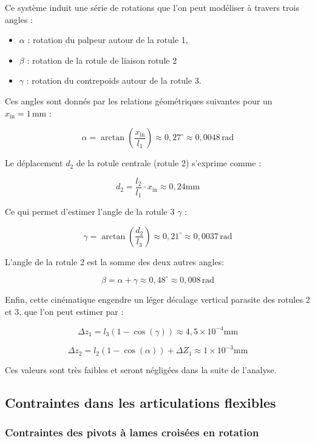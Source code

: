 \documentclass[a4paper, 11pt]{article} %
\begin{document}
Ce système induit une série de rotations que l’on peut modéliser à travers trois angles :
\begin{itemize}
    \item  \( \alpha \) : rotation du palpeur autour de la rotule 1,
    \item  \( \beta \) : rotation de la rotule de liaison rotule 2
    \item  \( \gamma \) : rotation du contrepoids autour de la rotule 3.
\end{itemize}




Ces angles sont donnés par les relations géométriques suivantes pour un $x_{\text{in} } = 1 \, \text{mm}$   :

\[
\alpha = \arctan\left( \frac{x_{\text{in}}}{l_1} \right) \approx 0,27^\circ \approx 0{,}0048 \, \text{rad}
\]

Le déplacement \( d_2 \) de la rotule centrale (rotule 2) s’exprime comme :

\[
d_2 = \frac{l_2}{l_1} \cdot x_{\text{in}} \approx 0,24
 \text{mm}
\]

Ce qui permet d'estimer l'angle de la rotule 3 \( \gamma \) :

$$
\gamma = \arctan\left( \frac{d_2}{l_3} \right) \approx 0,21^\circ \approx 0,0037\, \text{rad}
$$

L’angle de la rotule 2 est la somme des deux autres angles:

\[
\beta = \alpha + \gamma \approx 0,48^\circ
 \approx 0,008
 \, \text{rad}
\]

Enfin, cette cinématique engendre un léger décalage vertical parasite des rotules 2 et 3, que l’on peut estimer par :

$$
\Delta z_1 = l_3 (1 - \cos(\gamma)) \approx 4,5
\times 10^{-4}\text{mm}
$$

$$
\Delta z_2 = l_2 (1 - \cos(\alpha)) + \Delta Z_1 \approx 1\times 10^{-3}\text{mm}
$$



Ces valeurs sont très faibles et seront négligées dans la suite de l'analyse.

\subsection{Contraintes dans les articulations flexibles}
\subsubsection*{Contraintes des pivots à lames croisées en rotation}
\end{document}
